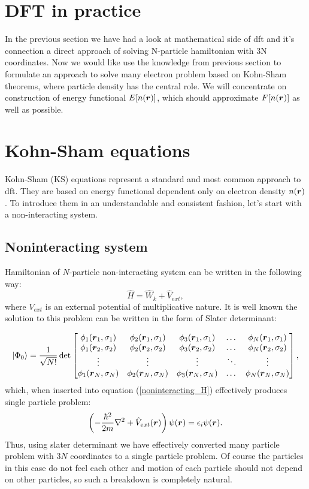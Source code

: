 \documentclass[openany, longbibliography,slovene,a4paper,12pt]{article}
\def\vec#1{\mbox{\boldmath$#1$}}
\begin{document}
  \section{DFT in practice}
  In the previous section we have had a look at mathematical side of dft and
  it's connection a direct approach of solving N-particle hamiltonian with
  3N coordinates. Now we would like use the knowledge from previous section to
  formulate an approach to solve many electron problem based on Kohn-Sham
  theorems, where particle density has the central role. We will concentrate on
  construction of energy functional $E[n(\vec r)]$, which should approximate
  $F[n(\vec r)]$ as well as possible.
  
  \section{Kohn-Sham equations}
  Kohn-Sham (KS) equations represent a standard and most common approach to dft.
  They are based on energy functional dependent only on electron density $n(\vec
  r)$. To introduce them in an understandable and consistent fashion, let's start with a
  non-interacting system. 
 
\subsection{Noninteracting system}
Hamiltonian of $N$-particle non-interacting system can be written in the
following way:
 \begin{equation} \label{noninteracting_H}
   \hat H =\hat  W_k + \hat V_{ext}, 
 \end{equation}
 where $V_{ext}$ is an external potential of multiplicative nature. It is well
 known the solution to this problem can be written in the form of Slater determinant:

 \[
       \ket{\Phi_0} = \frac{1}{\sqrt{N!}}\det 
   \begin{bmatrix}
   \phi_{1}(\vec r_1, \sigma_1) & \phi_{2}(\vec r_1, \sigma_1) & \phi_{3}(\vec
   r_1, \sigma_1) & \dots & \phi_{N}(\vec r_1, \sigma_1) \\
    \phi_{1}(\vec r_2, \sigma_2) & \phi_{2}(\vec r_2, \sigma_2) & \phi_{3}(\vec
    r_2, \sigma_2) & \dots & \phi_{N}(\vec r_2, \sigma_2) \\
    \vdots & \vdots & \vdots & \ddots & \vdots \\
     \phi_{1}(\vec r_N, \sigma_N) & \phi_{2}(\vec r_N, \sigma_N) & \phi_{3}(\vec r_N, \sigma_N) & \dots & \phi_{N}(\vec r_N, \sigma_N) \\
\end{bmatrix},
\]
 which, when inserted into equation (\ref{noninteracting_H}) effectively produces
 single particle problem:
 \begin{equation}
   \left(-\frac{\hbar^2}{2m}\nabla^2 + \hat V_{ext}(\vec r)\right) \psi (\vec r) = \epsilon_i \psi(\vec r).
 \end{equation}
 Thus, using slater determinant we have effectively converted many particle
 problem with $3N$ coordinates to a single particle problem. Of course the
 particles in this case do not feel each other and motion of each particle
 should not depend on other particles, so such a breakdown is completely natural.
 
\end{document}
